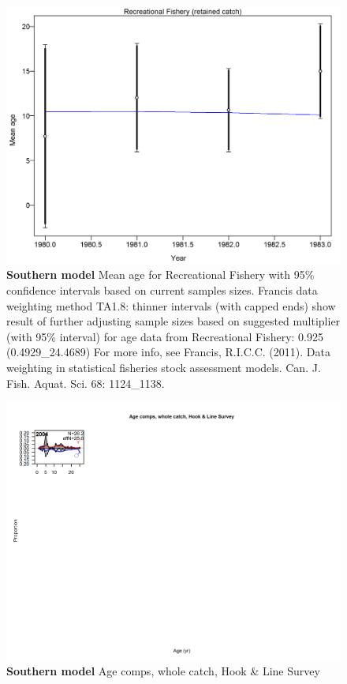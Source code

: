 \documentclass[12pt,]{article}
\begin{document}
\begin{figure}[htbp]
\centering
\includegraphics{./r4ss/plots_mod2/comp_agefit_data_weighting_TA1.8_Recreational Fishery.png}
\caption{\textbf{Southern model} Mean age for Recreational Fishery with
95\% confidence intervals based on current samples sizes. Francis data
weighting method TA1.8: thinner intervals (with capped ends) show result
of further adjusting sample sizes based on suggested multiplier (with
95\% interval) for age data from Recreational Fishery: 0.925
(0.4929\_24.4689) For more info, see Francis, R.I.C.C. (2011). Data
weighting in statistical fisheries stock assessment models. Can. J.
Fish. Aquat. Sci. 68: 1124\_1138.
\label{fig:mod2_4_comp_agefit_data_weighting_TA1.8_Recreational Fishery}}
\end{figure}

\begin{figure}[htbp]
\centering
\includegraphics{./r4ss/plots_mod2/comp_agefit_flt4mkt0.png}
\caption{\textbf{Southern model} Age comps, whole catch, Hook \& Line
Survey \label{fig:mod2_5_comp_agefit_flt4mkt0}}
\end{figure}
\end{document}
